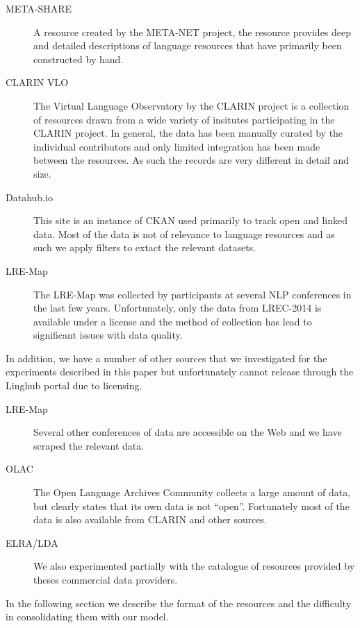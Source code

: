 \documentclass[smallextended]{svjour3}       %
\begin{document}
\begin{description}
    \item[META-SHARE] A resource created by the META-NET project,  the resource
        provides deep and detailed descriptions of language resources that have
        primarily been constructed by hand.
    \item[CLARIN VLO] The Virtual Language Observatory by the CLARIN project is
        a collection of resources drawn from a wide variety of insitutes
        participating in the CLARIN project. In general, the data has been
        manually curated by the individual contributors and only limited
        integration has been made between the resources. As such the records are
        very different in detail and size.
    \item[Datahub.io] This site is an instance of CKAN used primarily to track
        open and linked data. Most of the data is not of relevance to language
        resources and as such we apply filters to extact the relevant datasets.
    \item[LRE-Map] The LRE-Map was collected by participants at several NLP
        conferences in the last few years. Unfortunately, only the data from
        LREC-2014 is available under a license and the method of collection has
        lead to significant issues with data quality.
\end{description}

In addition, we have a number of other sources that we investigated for the
experiments described in this paper but unfortunately cannot release through the
Linghub portal due to licensing.

\begin{description}
    \item[LRE-Map] Several other conferences of data are accessible on the Web
        and we have scraped the relevant data.
    \item[OLAC] The Open Language Archives Community collects a large amount of
        data, but clearly states that its own data is not ``open''. Fortunately
        most of the data is also available from CLARIN and other sources.
    \item[ELRA/LDA] We also experimented partially with the catalogue of
        resources provided by theses commercial data providers.
\end{description}

In the following section we describe the format of the resources and the
difficulty in consolidating them with our model.
\end{document}
